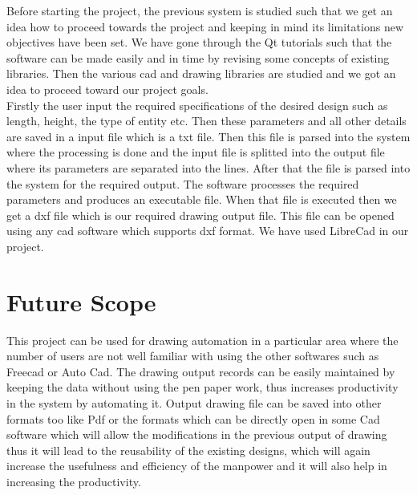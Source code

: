 \noindent Before starting the project, the previous system is studied such that we get an idea how to proceed towards the project and keeping in mind its limitations new objectives have been set. We have gone through the Qt tutorials such that the software can be made easily and in time by revising some concepts of existing libraries. Then the various cad and drawing libraries are studied and we got an idea to proceed toward our project goals.\\
\noindent Firstly the user input the required specifications of the desired design such as length, height, the type of entity etc. Then these parameters and all other details are saved in a input file which is a txt file. Then this file is parsed into the system where the processing is done and the input file is splitted into the output file where its parameters are separated into the lines. After that the file is parsed into the system for the required output. The software processes the required parameters and produces an executable file. When that file is executed then we get a dxf file which is our required drawing output file. This file can be opened using any cad software which supports dxf format. We have used LibreCad in our project. 
 
\section{Future Scope}
This project can be used for drawing automation in a particular area where the
number of users are not well familiar with using the other softwares such as Freecad or Auto Cad. The drawing output records can be easily maintained by keeping the
data without using the pen paper work, thus increases productivity in the system by automating it. Output drawing file can be saved into other formats too like Pdf or the formats which can be directly open in some Cad software which will allow the modifications in the previous output of drawing thus it will lead to the reusability of the existing  designs, which will again increase the usefulness and efficiency of the manpower and it will also help in increasing the productivity.
